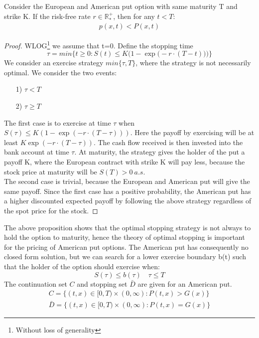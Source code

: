 \begin{proposition}{}
Consider the European and American put option with same maturity T and strike K. If the risk-free rate $r\in \mathbb{R}_*^+$, then for any $t<T$:
\begin{equation*}
\begin{split}
p(x,t)<P(x,t)
\end{split}
\end{equation*}
\begin{proof}
WLOG\footnote{Without loss of generality} we assume that t=0. Define the stopping time
$$\tau = min \{t\geq 0 : S(t) \leq K\bigg(1-\exp\Big(-r\cdot (T-t)\Big)\bigg)\}$$
We consider an exercise strategy $min\{\tau, T\}$, where the strategy is not necessarily optimal. We consider the two events:
\begin{enumerate}
\item[1)] $\tau<T$
\item[2)] $\tau \geq T$
\end{enumerate}
The first case is to exercise at time $\tau$ when $S(\tau) \leq K(1-\exp(-r\cdot (T-\tau)))$. Here the payoff by exercising will be at least $K\exp(-r\cdot (T-\tau))$. The cash flow received is then invested into the bank account at time $\tau$. At maturity, the strategy gives the holder of the put a payoff K, where the European contract with strike K will pay less, because the stock price at maturity will be $S(T)>0 \ a.s.$\\

The second case is trivial, because the European and American put will give the same payoff. Since the first case has a positive probability, the American put has a higher discounted expected payoff by following the above strategy regardless of the spot price for the stock. 
\end{proof}
\end{proposition}
The above proposition shows that the optimal stopping strategy is not always to hold the option to maturity, hence the theory of optimal stopping is important for the pricing of American put options. The American put has consequently no closed form solution, but we can search for a lower exercise boundary b(t) such that the holder of the option should exercise when:
$$S(\tau)\leq b(\tau) \quad \tau \leq T$$
The continuation set $C$ and stopping set $\bar{D}$ are given for an American put.
\begin{align*}
C=\{(t,x) \in [0,T) \times (0,\infty) : P(t,x) > G(x) \}\\
\bar{D}=\{(t,x) \in [0,T) \times (0,\infty) : P(t,x) = G(x) \}
\end{align*} 

